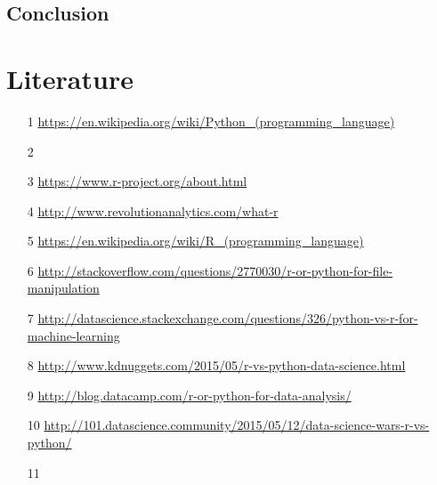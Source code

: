 \documentclass{article}
\begin{document}
\subsection{Conclusion}

\newpage
\section{Literature}
\begin{enumerate}
    \item[1] \url{https://en.wikipedia.org/wiki/Python_(programming_language)}
    \item[2]
    \item[3] \url{https://www.r-project.org/about.html}
    \item[4] \url{http://www.revolutionanalytics.com/what-r}
    \item[5] \url{https://en.wikipedia.org/wiki/R_(programming_language)}
    \item[6] \url{http://stackoverflow.com/questions/2770030/r-or-python-for-file-manipulation}
    \item[7] \url{http://datascience.stackexchange.com/questions/326/python-vs-r-for-machine-learning}
    \item[8] \url{http://www.kdnuggets.com/2015/05/r-vs-python-data-science.html}
    \item[9] \url{http://blog.datacamp.com/r-or-python-for-data-analysis/}
    \item[10] \url{http://101.datascience.community/2015/05/12/data-science-wars-r-vs-python/}
    \item[11]
\end{enumerate}
\end{document}
